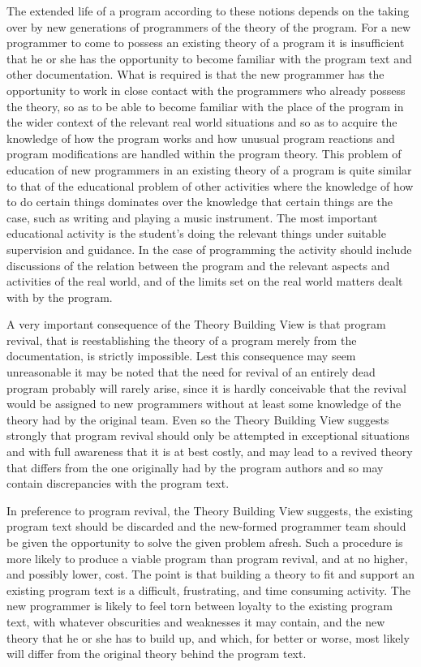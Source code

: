 \documentclass[12pt,letterpaper,twocolumn]{article}
\begin{document}
The extended life of a program according to these notions depends on the taking over by new generations of programmers of the theory of the program. For a new programmer to come to possess an existing theory of a program it is insufficient that he or she has the opportunity to become familiar with the program text and other documentation. What is required is that the new programmer has the opportunity to work in close contact with the programmers who already possess the theory, so as to be able to become familiar with the place of the program in the wider context of the relevant real world situations and so as to acquire the knowledge of how the program works and how unusual program reactions and program modifications are handled within the program theory. This problem of education of new programmers in an existing theory of a program is quite similar to that of the educational problem of other activities where the knowledge of how to do certain things dominates over the knowledge that certain things are the case, such as writing and playing a music instrument. The most important educational activity is the student's doing the relevant things under suitable supervision and guidance. In the case of programming the activity should include discussions of the relation between the program and the relevant aspects and activities of the real world, and of the limits set on the real world matters dealt with by the program.

A very important consequence of the Theory Building View is that program revival, that is reestablishing the theory of a program merely from the documentation, is strictly impossible. Lest this consequence may seem unreasonable it may be noted that the need for revival of an entirely dead program probably will rarely arise, since it is hardly conceivable that the revival would be assigned to new programmers without at least some knowledge of the theory had by the original team. Even so the Theory Building View suggests strongly that program revival should only be attempted in exceptional situations and with full awareness that it is at best costly, and may lead to a revived theory that differs from the one originally had by the program authors and so may contain discrepancies with the program text.

In preference to program revival, the Theory Building View suggests, the existing program text should be discarded and the new-formed programmer team should be given the opportunity to solve the given problem afresh. Such a procedure is more likely to produce a viable program than program revival, and at no higher, and possibly lower, cost. The point is that building a theory to fit and support an existing program text is a difficult, frustrating, and time consuming activity. The new programmer is likely to feel torn between loyalty to the existing program text, with whatever obscurities and weaknesses it may contain, and the new theory that he or she has to build up, and which, for better or worse, most likely will differ from the original theory behind the program text.
\end{document}

